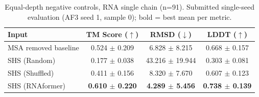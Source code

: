 \begin{table}[htbp]
\centering
\caption{Equal-depth negative controls, RNA single chain (n=91). Submitted single-seed evaluation (AF3 seed 1, sample 0); bold = best mean per metric.}
\label{tab:rna_single_chain_shuffle}
\begin{tabular}{lccc}
\toprule
Input & TM Score ($\uparrow$) & RMSD ($\downarrow$) & LDDT ($\uparrow$) \\
\midrule
MSA removed baseline & 0.524 $\pm$ 0.209 & 6.828 $\pm$ 8.215 & 0.668 $\pm$ 0.157 \\
SHS (Random) & 0.177 $\pm$ 0.038 & 43.216 $\pm$ 19.944 & 0.303 $\pm$ 0.081 \\
SHS (Shuffled) & 0.411 $\pm$ 0.156 & 8.320 $\pm$ 7.670 & 0.607 $\pm$ 0.123 \\
SHS (RNAformer) & \textbf{0.610 $\pm$ 0.220} & \textbf{4.289 $\pm$ 5.456} & \textbf{0.738 $\pm$ 0.139} \\
\bottomrule
\end{tabular}
\end{table}
